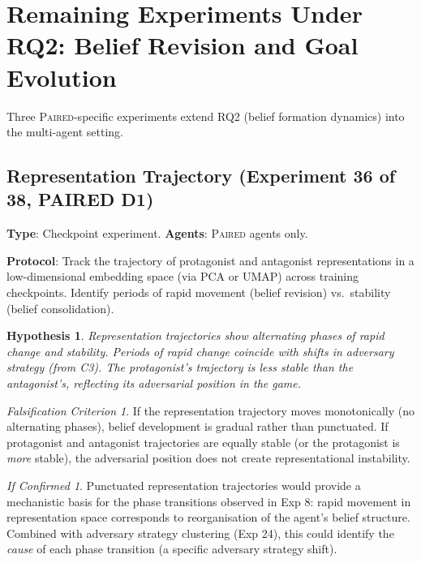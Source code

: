 \documentclass[11pt,a4paper]{article}
\newtheorem{hypothesis}{Hypothesis}[subsection]
\theoremstyle{remark}
\newtheorem*{falsification}{Falsification Criterion}
\newtheorem*{implication}{If Confirmed}
\newcommand{\paired}{\textsc{Paired}}
\begin{document}
\section{Remaining Experiments Under RQ2: Belief Revision and Goal Evolution}
\label{sec:rq2_continued}

Three \paired{}-specific experiments extend RQ2 (belief formation dynamics) into the multi-agent setting.

\subsection{Representation Trajectory (Experiment 36 of 38, PAIRED D1)}
\label{exp:representation_trajectory}

\textbf{Type}: Checkpoint experiment. \textbf{Agents}: \paired{} agents only.

\textbf{Protocol}: Track the trajectory of protagonist and antagonist representations in a low-dimensional embedding space (via PCA or UMAP) across training checkpoints. Identify periods of rapid movement (belief revision) vs.\ stability (belief consolidation).

\begin{hypothesis}
Representation trajectories show alternating phases of rapid change and stability. Periods of rapid change coincide with shifts in adversary strategy (from C3). The protagonist's trajectory is less stable than the antagonist's, reflecting its adversarial position in the game.
\end{hypothesis}

\begin{falsification}
If the representation trajectory moves monotonically (no alternating phases), belief development is gradual rather than punctuated. If protagonist and antagonist trajectories are equally stable (or the protagonist is \textit{more} stable), the adversarial position does not create representational instability.
\end{falsification}

\begin{implication}
Punctuated representation trajectories would provide a mechanistic basis for the phase transitions observed in Exp 8: rapid movement in representation space corresponds to reorganisation of the agent's belief structure. Combined with adversary strategy clustering (Exp 24), this could identify the \textit{cause} of each phase transition (a specific adversary strategy shift).
\end{implication}
\end{document}
